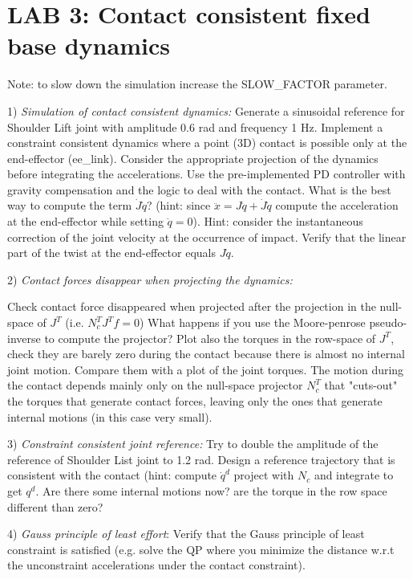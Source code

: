 \documentclass{report}
\begin{document}
\section*{LAB 3: Contact consistent fixed base dynamics}

Note: to slow down the simulation increase the SLOW\_FACTOR parameter.


1) \textit{Simulation of contact consistent dynamics:}
Generate a sinusoidal reference for Shoulder Lift joint with amplitude 0.6 rad and frequency 1 Hz.
Implement a constraint consistent dynamics where a point (3D) contact is possible only at the end-effector (ee\_link). 
Consider the appropriate projection of the dynamics before integrating the accelerations. 
Use the pre-implemented PD controller with gravity compensation and the logic 
to deal with the contact. What is the best way to compute the term $\dot{J}\dot{q}$? (hint: since $\ddot{x} = J\ddot{q} + \dot{J}\dot{q}$ compute the acceleration at the end-effector while setting $\ddot{q}= 0$).
Hint: consider the instantaneous correction of the joint velocity at the occurrence of impact.
Verify that the linear part of the twist at the end-effector equals $J\dot{q}$.


2) \textit{Contact forces disappear when projecting the dynamics:}

Check contact force disappeared when projected after the projection in the null-space of $J^T$  (i.e. $ N_c^TJ^Tf = 0$) 
What happens if you use the Moore-penrose pseudo-inverse to compute the projector?
Plot also the torques in the row-space of $J^T$, check they are barely zero 
during the contact because there is almost no internal joint motion. 
Compare them with a plot of the joint torques.
The motion during the contact depends mainly only on the null-space projector $N_c^T$
that "cuts-out" the torques that generate contact forces, leaving only the ones that generate internal motions (in this case very small).

3) \textit{Constraint consistent joint reference:}
Try to double the amplitude of the reference of Shoulder List joint to 1.2 rad.
Design a reference trajectory that is consistent with the contact (hint: compute $\dot{q}^{d}$ project with $N_c$ and integrate to get $q^d$.
Are there some internal motions now? are the torque in the row space different than zero?  

4) \textit{Gauss principle of least effort}:
Verify that the Gauss principle of least constraint is satisfied (e.g. solve the QP where you minimize the distance w.r.t the unconstraint accelerations under the contact constraint).
\end{document}
